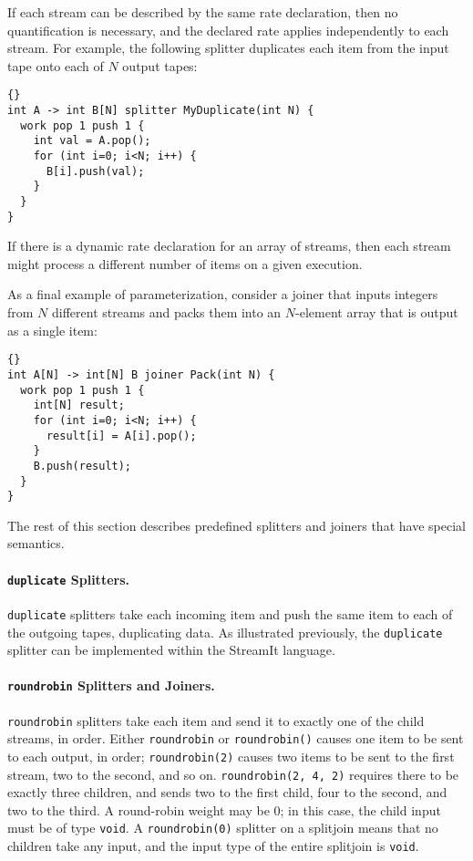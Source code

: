 \documentclass[11pt]{article}
\begin{document}
\begin{enumerate}
If each stream can be described by the same rate declaration, then no
quantification is necessary, and the declared rate applies
independently to each stream.  For example, the following splitter
duplicates each item from the input tape onto each of $N$ output
tapes:
\begin{lstlisting}{}
int A -> int B[N] splitter MyDuplicate(int N) {
  work pop 1 push 1 {
    int val = A.pop();
    for (int i=0; i<N; i++) {
      B[i].push(val);
    }
  }
}
\end{lstlisting}
If there is a dynamic rate declaration for an array of streams, then
each stream might process a different number of items on a given
execution.

As a final example of parameterization, consider a joiner that inputs
integers from $N$ different streams and packs them into an $N$-element
array that is output as a single item:
\begin{lstlisting}{}
int A[N] -> int[N] B joiner Pack(int N) {
  work pop 1 push 1 {
    int[N] result;
    for (int i=0; i<N; i++) {
      result[i] = A[i].pop();
    }
    B.push(result);
  }
}
\end{lstlisting}

\end{enumerate}

The rest of this section describes predefined splitters and joiners
that have special semantics.

\paragraph{\lstinline|duplicate| Splitters.} \lstinline|duplicate| 
splitters take each incoming item and push the same item to each of
the outgoing tapes, duplicating data.  As illustrated previously, the
\lstinline|duplicate| splitter can be implemented within the StreamIt
language.

\paragraph{\lstinline|roundrobin| Splitters and Joiners.}  \lstinline|roundrobin| 
splitters take each item and send it to exactly one of the child
streams, in order.  Either \lstinline|roundrobin| or
\lstinline|roundrobin()| causes one item to be sent to each output, in
order; \lstinline|roundrobin(2)| causes two items to be sent to the
first stream, two to the second, and so on.  \lstinline|roundrobin(2, 4, 2)| 
requires there to be exactly three children, and sends two to
the first child, four to the second, and two to the third.  A
round-robin weight may be 0; in this case, the child input must be of
type \lstinline|void|.  A \lstinline|roundrobin(0)| splitter on a
splitjoin means that no children take any input, and the input type
of the entire splitjoin is \lstinline|void|.
\end{document}
